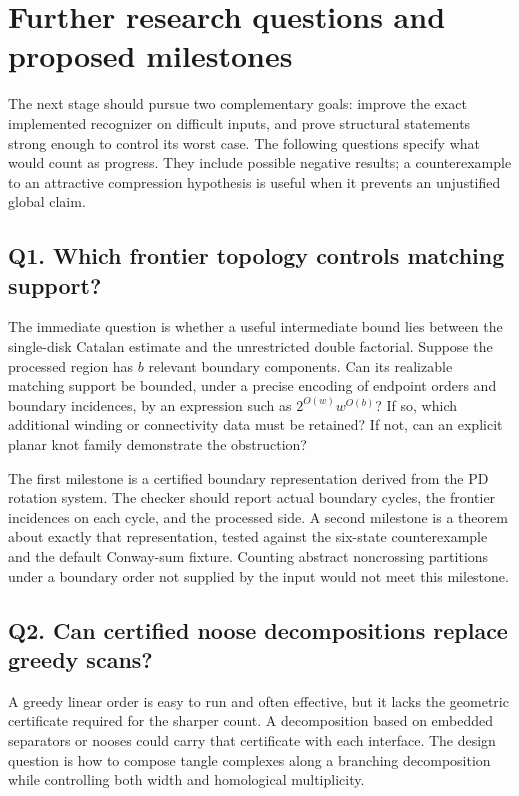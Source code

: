 \section{Further research questions and proposed milestones}
\label{sec:research}

The next stage should pursue two complementary goals: improve the exact
implemented recognizer on difficult inputs, and prove structural statements
strong enough to control its worst case.  The following questions specify
what would count as progress.  They include possible negative results; a
counterexample to an attractive compression hypothesis is useful when it
prevents an unjustified global claim.

\subsection{Q1. Which frontier topology controls matching support?}

The immediate question is whether a useful intermediate bound lies between
the single-disk Catalan estimate and the unrestricted double factorial.
Suppose the processed region has $b$ relevant boundary components.  Can its
realizable matching support be bounded, under a precise encoding of endpoint
orders and boundary incidences, by an expression such as
$2^{O(w)}w^{O(b)}$?  If so, which additional winding or connectivity data
must be retained?  If not, can an explicit planar knot family demonstrate
the obstruction?

The first milestone is a certified boundary representation derived from
the PD rotation system.  The checker should report actual boundary cycles,
the frontier incidences on each cycle, and the processed side.  A second
milestone is a theorem about exactly that representation, tested against
the six-state counterexample and the default Conway-sum fixture.  Counting
abstract noncrossing partitions under a boundary order not supplied by the
input would not meet this milestone.

\subsection{Q2. Can certified noose decompositions replace greedy scans?}

A greedy linear order is easy to run and often effective, but it lacks the
geometric certificate required for the sharper count.  A decomposition based
on embedded separators or nooses could carry that certificate with each
interface.  The design question is how to compose tangle complexes along a
branching decomposition while controlling both width and homological
multiplicity.

